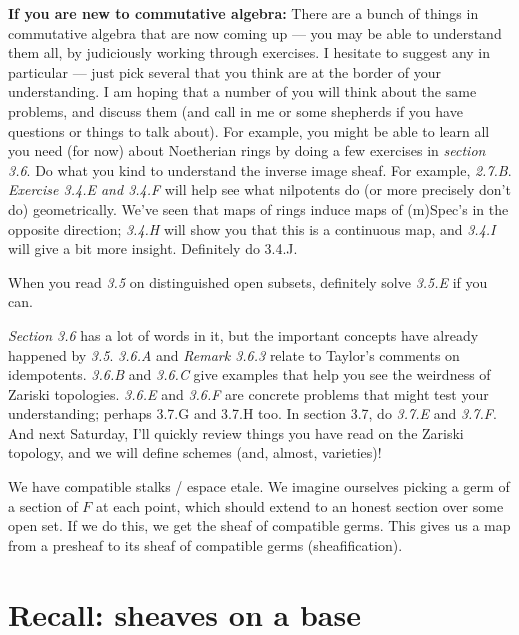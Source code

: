 \documentclass{book}
\theoremstyle{definition}
\begin{document}
\begin{itemize}
    \textbf{If you are new to commutative algebra:} There are a bunch of things in
    commutative algebra that are now coming up --- you may be able to
    understand them all, by judiciously working through exercises. I
    hesitate to suggest any in particular --- just pick several that you
    think are at the border of your understanding. I am hoping that a
    number of you will think about the same problems, and discuss them (and
    call in me or some shepherds if you have questions or things to talk
    about). For example, you might be able to learn all you need (for now)
    about Noetherian rings by doing a few exercises in \emph{section 3.6}.
    Do what you kind to understand the inverse image sheaf. For example, \emph{2.7.B}.
    \emph{Exercise 3.4.E and 3.4.F} will help see what nilpotents do (or more
    precisely don’t do) geometrically. We’ve seen that maps of rings induce
    maps of (m)Spec’s in the opposite direction; \emph{3.4.H} will show you that
    this is a continuous map, and \emph{3.4.I} will give a bit more insight.
    Definitely do 3.4.J.

    When you read \emph{3.5} on distinguished open subsets, definitely solve \emph{3.5.E} if
    you can.

    \emph{Section 3.6} has a lot of words in it, but the important concepts have
    already happened by \emph{3.5}. \emph{3.6.A} and \emph{Remark 3.6.3} relate to Taylor’s
    comments on idempotents. \emph{3.6.B} and \emph{3.6.C} give examples that help you
    see the weirdness of Zariski topologies. \emph{3.6.E} and \emph{3.6.F} are concrete
    problems that might test your understanding; perhaps 3.7.G and 3.7.H
    too.  In section 3.7, do \emph{3.7.E} and \emph{3.7.F}.
    And next Saturday, I’ll quickly review things you have read on the Zariski
    topology, and we will define schemes (and, almost, varieties)!



\end{itemize}


We have compatible stalks / espace etale. We imagine ourselves picking a germ
of a section of $F$ at each point, which should extend to an honest
section over some open set. If we do this, we get the sheaf of compatible
germs. This gives us a map from a presheaf to its sheaf of compatible
germs (sheafification).

\section{Recall: sheaves on a base}
\end{document}
